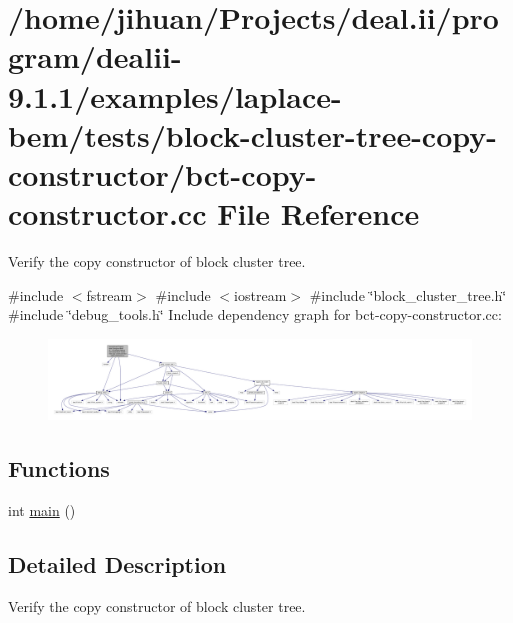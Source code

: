 \hypertarget{bct-copy-constructor_8cc}{}\section{/home/jihuan/\+Projects/deal.ii/program/dealii-\/9.1.1/examples/laplace-\/bem/tests/block-\/cluster-\/tree-\/copy-\/constructor/bct-\/copy-\/constructor.cc File Reference}
\label{bct-copy-constructor_8cc}


Verify the copy constructor of block cluster tree.  


{\ttfamily \#include $<$fstream$>$}\newline
{\ttfamily \#include $<$iostream$>$}\newline
{\ttfamily \#include \char`\"{}block\+\_\+cluster\+\_\+tree.\+h\char`\"{}}\newline
{\ttfamily \#include \char`\"{}debug\+\_\+tools.\+h\char`\"{}}\newline
Include dependency graph for bct-\/copy-\/constructor.cc\+:\nopagebreak
\begin{figure}[H]
\begin{center}
\leavevmode
\includegraphics[width=350pt]{bct-copy-constructor_8cc__incl}
\end{center}
\end{figure}
\subsection*{Functions}
\begin{DoxyCompactItemize}
\item 
int \hyperlink{bct-copy-constructor_8cc_ae66f6b31b5ad750f1fe042a706a4e3d4}{main} ()
\end{DoxyCompactItemize}


\subsection{Detailed Description}
Verify the copy constructor of block cluster tree. 

